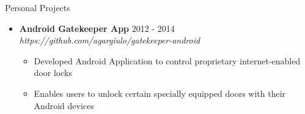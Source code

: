 \documentclass[10pt,oneside]{article}
\newenvironment{ressection}[1]{
	\vspace{3pt}
	{\fontfamily{bch}\selectfont\Large#1}
	\begin{itemize}
	\vspace{2pt}
}{
	\end{itemize}
}
\newcommand{\ressubitem}[1]{
	\vspace{-1pt}
	\item \begin{flushleft} #1 \end{flushleft}
}
\newcommand{\resaltitem}[3]{
	\vspace{-3pt}
	\item
	\textbf{#1} \hfill #2 \\
	\textit{#3}
}
\newenvironment{resaltsec}[3]{
	\resaltitem{#1}{#2}{#3}
	\vspace{-1pt}
	\begin{itemize}
}{
	\end{itemize}
}
\begin{document}
\begin{ressection}{Personal Projects}


	\begin{resaltsec}{Android Gatekeeper App}{2012 - 2014}{https://github.com/agargiulo/gatekeeper-android}
		\ressubitem{Developed Android Application to control proprietary internet-enabled door locks}
		\ressubitem{Enables users to unlock certain specially equipped doors with their Android devices}
	\end{resaltsec}


\end{ressection}
\end{document}
